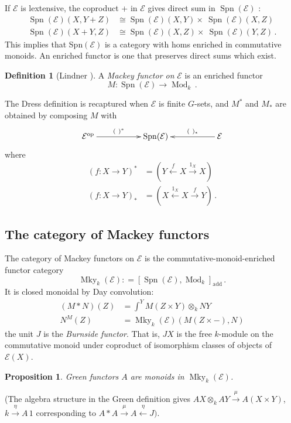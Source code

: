 \documentclass[a4paper,12pt]{article}
\newtheorem*{Proposition}{Proposition}
\theoremstyle{definition}
\newtheorem*{Definition}{Definition}%
\theoremstyle{fact}
\theoremstyle{genquest}
\theoremstyle{step}
\newcommand{\catE}{\mathcal{E}}
\newcommand{\Mky}{\operatorname{Mky}}
\newcommand{\Mod}{\operatorname{Mod}}
\newcommand{\Spn}{\operatorname{Spn}}
\newcommand{\add}{\operatorname{add}}
\newcommand{\op}{\operatorname{op}}
\newcommand{\longto}{\longrightarrow}
\begin{document}
\medskip\noindent
If $\catE$ is lextensive, the coproduct + in $\catE$ gives direct sum in $\Spn (\catE)$ :
%
\begin{align*}
\Spn (\catE) (X,Y + Z) &\cong \Spn (\catE) (X,Y) \times \ \Spn  (\catE) (X,Z)
\\
\Spn (\catE) (X + Y, Z) &\cong \Spn (\catE) (X,Z) \times \ \Spn  (\catE) (Y,Z)\,.
\end{align*}
This implies that Spn$(\catE)$ is a category with homs enriched in commutative monoids.   An enriched functor is one that preserves direct sums which exist.

 
\begin{Definition}[Lindner \cite{Lindner1976}]
A \emph{Mackey functor on} $\catE$ is an enriched functor
 \[
 M : \Spn (\catE) \longto \Mod _k\,.
 \]
\end{Definition}

\noindent
The Dress definition is recaptured when $\catE$ is finite $G$-sets, and $M^\ast$ and $M_\ast$ are obtained by composing $M$ with
\[ \xymatrix{
\catE^{\op} \ar[rr]^-{(\ )^\ast} && \Spn (\catE) && \catE \ar[ll]_-{(\ )_\ast}
}\]
where 
\begin{align*}
(f : X \longto Y)^{\ast} &=  (Y \stackrel{f}{ \longleftarrow} X \stackrel{1_X}{ \longto} X) 
\\
(f : X \longto Y)_{\ast} &= (X \stackrel{1_X}{ \longleftarrow} X \stackrel{f}{ \longto} Y) \,.
\end{align*}

\subsection{The category of Mackey functors\label{Lecture3sub2}}

The category of Mackey functors on $\catE$ is the commutative-monoid-enriched functor  category
\[
\Mky _k (\catE) : = [\Spn  (\catE), \Mod _k]_{\add}\,.
\]
It is closed monoidal by Day convolution:
\begin{align*}
(M \ast N) (Z) &= \int^Y M(Z\times Y) \otimes_k NY
\\
N^M (Z) &= \Mky _k (\catE) (M(Z \times -),N)
\end{align*}
the unit $J$ is the \emph{Burnside functor}. That is,
$JX$ is the free $k$-module on the commutative monoid under coproduct of isomorphism classes of objects of $\catE(X)$. 

\begin{Proposition}
 Green functors $A$ are monoids in $\Mky _k (\catE)$.
\end{Proposition}
\noindent
(The algebra structure in the Green definition gives $AX \otimes_k AY \stackrel{\mu}{\longto} A (X \times Y)$, 
$k \stackrel{\eta}{\longto} A\,1$  corresponding to $A \ast A \stackrel{\mu}{\longto}  A \stackrel{\eta}{\longleftarrow}  J)$.
\end{document}
